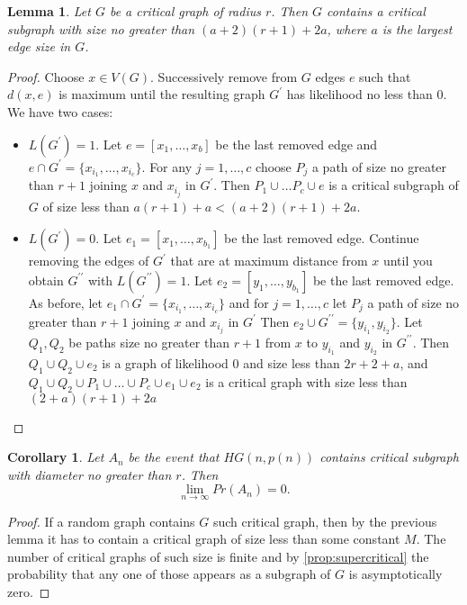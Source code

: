 \documentclass[11pt,notitlepage]{report}
\newtheorem{lemma}{Lemma}[chapter]
\newtheorem{corollary}{Corollary}[chapter]
\theoremstyle{definition}
\newcommand{\Ln}{\lim\limits_{n\to \infty}}
\begin{document}
\begin{lemma}
	Let $G$ be a critical graph of radius $r$.
	Then $G$ contains a critical subgraph with size no greater than
	$(a+2)(r+1)+2a$, where $a$ is the largest edge size in $G$. 
\end{lemma}
\begin{proof}
	Choose $x\in V(G)$. Successively remove from $G$ edges $e$
	such that $d(x, e)$ is maximum until the resulting graph 
	$G^\prime$ has likelihood no less than $0$. We have two cases:
	\begin{itemize}[leftmargin=*]
		\item $L(G^\prime)=1$. Let $e=[x_1, \dots, x_b]$ be
		the last removed edge and
		$e\cap G^\prime=\{ x_{i_1}, \dots, x_{i_c}\}$.
		For any $j=1,\dots, c$ choose 
		$P_j$ a path of size no greater than $r+1$ joining
		$x$ and $x_{i_j}$ in $G^\prime$.   
		Then $P_1\cup \dots P_c \cup e$ is a critical subgraph of $G$
		of size less than $a(r+1) + a< (a+2)(r+1) + 2a$.
		\item $L(G^\prime)=0$. Let $e_1=[x_1, \dots, x_{b_1}]$ be the
		last removed edge. Continue removing the edges of $G^\prime$ 
		that are at maximum distance from $x$ until you obtain 
		$G^{\prime \prime}$ with $L(G^{\prime\prime})=1$. Let 
		$e_2=[y_1, \dots, y_{b_1}]$ be the last removed edge.
		As before, let $e_1\cap G^\prime=\{ x_{i_1}, \dots, x_{i_c}\}$
		and for $j=1,\dots, c$ let $P_j$ a path of size no greater than $r+1$ 
		joining	$x$ and $x_{i_j}$ in $G^\prime$
		Then $e_2 \cup G^{\prime \prime}=\{ y_{i_1}, y_{i_2}  \}$.
		Let $Q_1, Q_2$ be paths size no greater than $r+1$ from
		$x$ to $y_{i_1}$ and $y_{i_2}$ in $G^{\prime \prime}$.
		Then $Q_1 \cup Q_2 \cup e_2$ is a graph of likelihood $0$ 
		and size less than $2r+2 + a$,
		and $Q_1\cup Q_2\cup P_1 \cup \dots \cup P_c \cup e_1 \cup e_2$ 
		is a critical graph	with size less than $(2+a)(r+1) + 2a$	
	\end{itemize} 
\end{proof}


\begin{corollary}
	Let $A_n$ be the event that $HG(n,p(n))$ contains critical 
	subgraph with diameter no greater than $r$. Then
	\[ \Ln Pr(A_n)=0. \]
\end{corollary}
\begin{proof}
	If a random graph contains $G$ such critical graph, then by the previous
	lemma it has to contain a critical graph of size less than some constant $M$.
	The number of critical graphs of such size is finite and by
	\cref{prop:supercritical} the probability 
	that any one of those appears as a subgraph of $G$ is asymptotically zero.	 
\end{proof}
\end{document}

